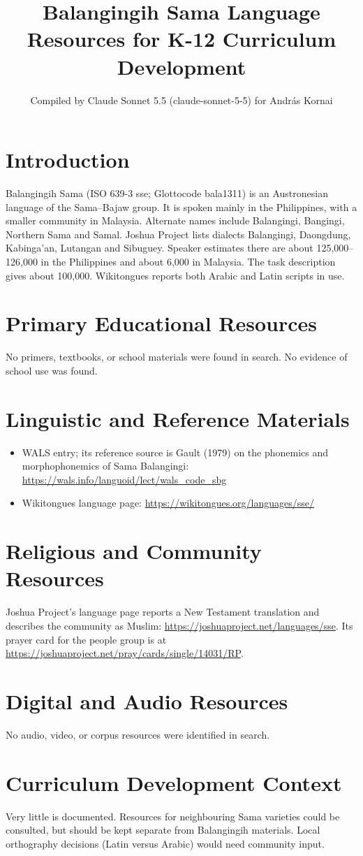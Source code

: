 \documentclass[12pt]{article}
\title{Balangingih Sama Language Resources for K-12 Curriculum Development}
\author{Compiled by Claude Sonnet 5.5 (claude-sonnet-5-5) for Andr\'as Kornai}
\date{}
\begin{document}
\maketitle

\section{Introduction}
Balangingih Sama (ISO 639-3 sse; Glottocode bala1311) is an Austronesian language of the Sama--Bajaw group. It is spoken mainly in the Philippines, with a smaller community in Malaysia. Alternate names include Balangingi, Bangingi, Northern Sama and Samal. Joshua Project lists dialects Balangingi, Daongdung, Kabinga'an, Lutangan and Sibuguey. Speaker estimates there are about 125,000--126,000 in the Philippines and about 6,000 in Malaysia. The task description gives about 100,000. Wikitongues reports both Arabic and Latin scripts in use.

\section{Primary Educational Resources}
No primers, textbooks, or school materials were found in search. No evidence of school use was found.

\section{Linguistic and Reference Materials}
\begin{itemize}
\item WALS entry; its reference source is Gault (1979) on the phonemics and morphophonemics of Sama Balangingi: \url{https://wals.info/languoid/lect/wals_code_sbg}
\item Wikitongues language page: \url{https://wikitongues.org/languages/sse/}
\end{itemize}

\section{Religious and Community Resources}
Joshua Project's language page reports a New Testament translation and describes the community as Muslim: \url{https://joshuaproject.net/languages/sse}. Its prayer card for the people group is at \url{https://joshuaproject.net/pray/cards/single/14031/RP}.

\section{Digital and Audio Resources}
No audio, video, or corpus resources were identified in search.

\section{Curriculum Development Context}
Very little is documented. Resources for neighbouring Sama varieties could be consulted, but should be kept separate from Balangingih materials. Local orthography decisions (Latin versus Arabic) would need community input.
\end{document}
